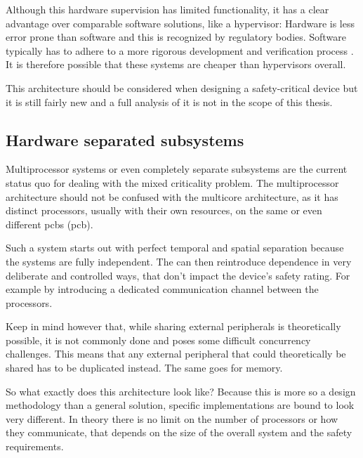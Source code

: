 Although this hardware supervision has limited functionality, it has a clear advantage over comparable software solutions, like a hypervisor: Hardware is less error prone than software and this is recognized by regulatory bodies. Software typically has to adhere to a more rigorous development and verification process \cite{IEC.2010-3}. It is therefore possible that these systems are cheaper than hypervisors overall. 

This architecture should be considered when designing a safety-critical device but it is still fairly new and a full analysis of it is not in the scope of this thesis.
\subsection{Hardware separated subsystems \label{HSS}}
Multiprocessor systems or even completely separate subsystems are the current status quo for dealing with the mixed criticality problem. The multiprocessor architecture should not be confused with the multicore architecture, as it has distinct processors, usually with their own resources, on the same or even different \acrlong{pcb}s (\acrshort{pcb}).

Such a system starts out with perfect temporal and spatial separation because the systems are fully independent. The \mfg{} can then reintroduce dependence in very deliberate and controlled ways, that don't impact the device's safety rating. For example by introducing a dedicated communication channel between the processors. 

Keep in mind however that, while sharing external peripherals is theoretically possible, it is not commonly done and poses some difficult concurrency challenges. This means that any external peripheral that could theoretically be shared has to be duplicated instead. The same goes for memory.

So what exactly does this architecture look like? Because this is more so a design methodology than a general solution, specific implementations are bound to look very different. In theory there is no limit on the number of processors or how they communicate, that depends on the size of the overall system and the safety requirements. 

